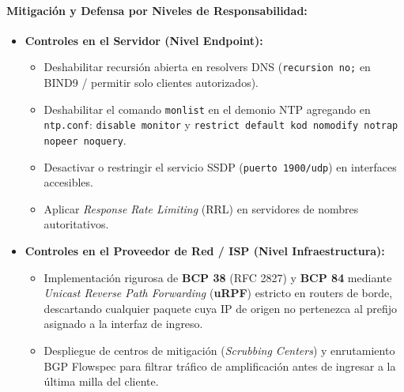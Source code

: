 \documentclass[11pt,letterpaper]{article}
\begin{document}
\paragraph{Mitigación y Defensa por Niveles de Responsabilidad:}
\begin{itemize}
    \item \textbf{Controles en el Servidor (Nivel Endpoint):}
    \begin{itemize}
        \item Deshabilitar recursión abierta en resolvers DNS (\texttt{recursion no;} en BIND9 / permitir solo clientes autorizados).
        \item Deshabilitar el comando \texttt{monlist} en el demonio NTP agregando en \texttt{ntp.conf}: \texttt{disable monitor} y \texttt{restrict default kod nomodify notrap nopeer noquery}.
        \item Desactivar o restringir el servicio SSDP (\texttt{puerto 1900/udp}) en interfaces accesibles.
        \item Aplicar \textit{Response Rate Limiting} (RRL) en servidores de nombres autoritativos.
    \end{itemize}
    \item \textbf{Controles en el Proveedor de Red / ISP (Nivel Infraestructura):}
    \begin{itemize}
        \item Implementación rigurosa de \textbf{BCP 38} (RFC 2827) y \textbf{BCP 84} mediante \textit{Unicast Reverse Path Forwarding} (\textbf{uRPF}) estricto en routers de borde, descartando cualquier paquete cuya IP de origen no pertenezca al prefijo asignado a la interfaz de ingreso.
        \item Despliegue de centros de mitigación (\textit{Scrubbing Centers}) y enrutamiento BGP Flowspec para filtrar tráfico de amplificación antes de ingresar a la última milla del cliente.
    \end{itemize}
\end{itemize}
\end{document}
